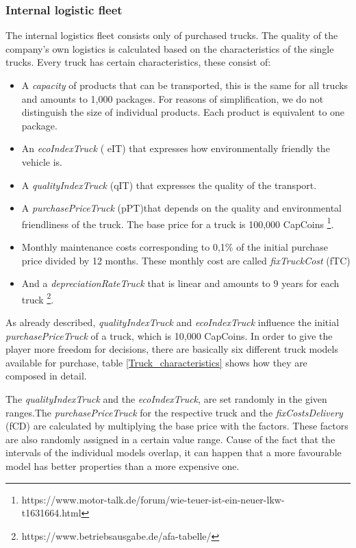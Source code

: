 \subsubsection{Internal logistic fleet}
The internal logistics fleet consists only of purchased trucks. The quality of the company's own logistics is calculated based on the characteristics of the single trucks. Every truck has certain characteristics, these consist of:
\begin{itemize}
    \item A \textit{capacity} of products that can be transported, this is the same for all trucks and amounts to 1,000 packages. For reasons of simplification, we do not distinguish the size of individual products.  Each product is equivalent to one package. 
    \item An \textit{ecoIndexTruck} ( \gls{eIT}) that expresses how environmentally friendly the vehicle is.
    \item A \textit{qualityIndexTruck} (\gls{qIT}) that expresses the quality of the transport.
    \item A \textit{purchasePriceTruck} (\gls{pPT})that depends on the quality and environmental friendliness of the truck. The base price for a truck is 100,000 CapCoins 
    \footnote{https://www.motor-talk.de/forum/wie-teuer-ist-ein-neuer-lkw-t1631664.html}.
    \item Monthly maintenance costs corresponding to 0,1\% of the initial purchase price divided by 12 months. These monthly cost are called \textit{fixTruckCost} (\gls{fTC})
    \item And a \textit{depreciationRateTruck} that is linear and amounts to 9 years for each truck \footnote{https://www.betriebsausgabe.de/afa-tabelle/}.
\end{itemize}

As already described, \textit{qualityIndexTruck} and \textit{ecoIndexTruck} influence the initial \textit{purchasePriceTruck} of a truck, which is 10,000 CapCoins. In order to give the player more freedom for decisions, there are basically six different truck models available for purchase, table \ref{Truck_characteristics} shows how they are composed in detail.

The \textit{qualityIndexTruck} and the \textit{ecoIndexTruck}, are set randomly in the given ranges.The \textit{purchasePriceTruck} for the respective truck and the \textit{fixCostsDelivery} (\gls{fCD}) are calculated by multiplying the base price with the factors. These factors are also randomly assigned in a certain value range. Cause of the fact that the intervals of the individual models overlap, it can happen that a more favourable model has better properties than a more expensive one.

